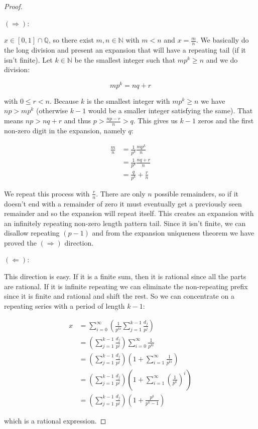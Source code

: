 \begin{proof} \

$(\Rightarrow)$:

$x \in [0, 1] \cap \mathbb{Q}$, so there exist $m, n \in \mathbb{N}$ with $m < n$ and $x = \frac{m}{n}$. We basically do the long division and present an expansion that will have a repeating tail (if it isn't finite). Let $k \in \mathbb{N}$ be the smallest integer such that $m p^k \geq n$ and we do division:

$$
m p^k = n q + r
$$

with $0 \leq r < n$. Because $k$ is the smallest integer with $m p^k \geq n$ we have $n p > m p^k$ (otherwise $k-1$ would be a smaller integer satisfying the same). That means $n p > n q + r$ and thus $p > \frac{n p - r}{n} > q$. This gives us $k-1$ zeros and the first non-zero digit in the expansion, namely $q$:

\begin{align*}
\frac{m}{n} &= \frac{1}{p^k} \frac{m p^k}{n} \\
            &= \frac{1}{p^k} \frac{ n q + r}{n} \\
            &= \frac{q}{p^k} + \frac{r}{n}
\end{align*}

We repeat this process with $\frac{r}{n}$. There are only $n$ possible remainders, so if it doesn't end with a remainder of zero it must eventually get a previously seen remainder and so the expansion will repeat itself. This creates an expansion with an infinitely repeating non-zero length pattern tail. Since it isn't finite, we can disallow repeating $(p-1)$ and from the expansion uniqueness theorem we have proved the $(\Rightarrow)$ direction.

$(\Leftarrow)$:

This direction is easy. If it is a finite sum, then it is rational since all the parts are rational. If it is infinite repeating we can eliminate the non-repeating prefix since it is finite and rational and shift the rest. So we can concentrate on a repeating series with a period of length $k-1$:

\begin{align*}
x &= \sum_{i = 0}^\infty (\frac{1}{p^{k i}} \sum_{j = 1}^{k-1} \frac{d_j}{p^j}) \\
  &= (\sum_{j = 1}^{k-1} \frac{d_j}{p^j}) \sum_{i = 0}^\infty \frac{1}{p^{k i}} \\
  &= (\sum_{j = 1}^{k-1} \frac{d_j}{p^j}) (1 + \sum_{i = 1}^\infty \frac{1}{p^{k i}}) \\
  &= (\sum_{j = 1}^{k-1} \frac{d_j}{p^j}) (1 + \sum_{i = 1}^\infty (\frac{1}{p^{k}})^i) \\
  &= (\sum_{j = 1}^{k-1} \frac{d_j}{p^j}) (1 + \frac{p^k}{p^k -1})
\end{align*}

which is a rational expression.
\end{proof}


